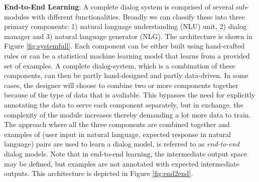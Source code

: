 \textbf{End-to-End Learning}: A complete dialog system is comprised of several sub-modules with different functionalities. Broadly we can classify these into three primary components: 1) natural language understanding (NLU) unit, 2) dialog manager and 3) natural language generator (NLG). The architecture is shown in Figure \ref{fig:systemfull}. Each component can be either built using hand-crafted rules or can be a statistical machine learning model that learns from a provided set of examples. A complete dialog-system, which is a combination of these components, can then be partly hand-designed and partly data-driven. In some cases, the designer will choose to combine two or more components together because of the type of data that is avaliable. This bypasses the need for explicitly annotating the data to serve each component separately, but in exchange, the complexity of the module increases thereby demanding a lot more data to train. The approach where all the three components are combined together and examples of (user input in natural language, expected response in natural language) pairs are used to learn a dialog model, is referred to as \textit{end-to-end} dialog models. Note that in end-to-end learning, the intermediate output space may be defined, but examples are not annotated with expected intermediate outputs. This architecture is depicted in Figure \ref{fig:end2end}.

